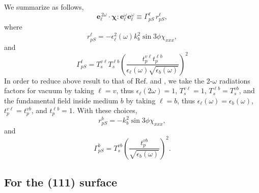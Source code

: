 We summarize as follows,
\begin{equation*}
\mathbf{e}^{\,2\omega}_{\ell}\cdot
\boldsymbol{\chi}:\mathbf{e}^\omega_{\ell}\mathbf{e}^\omega_{\ell}
\equiv\Gamma^{\ell}_{pS}\, r^{\ell}_{pS},
\end{equation*}
where
\begin{equation*}
r^{\ell}_{pS}
= -\epsilon^{2}_{\ell}(\omega)k^{2}_{b}\sin3\phi\chi_{xxx},
\end{equation*} 
and  
\begin{equation*}
\Gamma^{\ell}_{pS} =
T^{v\ell}_{s}T^{\ell b}_{s}\left(\frac{t^{v\ell}_{p}t^{\ell b}_{p}}
      {\epsilon_{\ell}(\omega)\sqrt{\epsilon_{b}(\omega)}}\right)^{2}
\end{equation*} 
In order to reduce above result to that of Ref. \cite{mizrahiJOSA88} and
\cite{sipePRB87},  we take the 2-$\omega$ radiations factors for vacuum by
taking $\ell=v$, thus $\epsilon_{\ell}(2\omega)=1$, $T^{v\ell}_{s}=1$,
$T^{\ell b}_{s}=T^{vb}_{s}$, and the fundamental field inside medium $b$ by
taking $\ell=b$, thus $\epsilon_{\ell}(\omega)=\epsilon_{b}(\omega)$,
$t^{v\ell}_{p}=t^{vb}_{p}$, and $t^{\ell b}_{p}=1$. With these choices,
\begin{equation*}
r^{b}_{pS} = -k^{2}_{b}\sin3\phi\chi_{xxx},
\end{equation*} 
and 
\begin{equation*}
\Gamma^{b}_{pS} =
T^{vb}_{s}
\left(
\frac{t^{vb}_{p}}{\sqrt{\epsilon_{b}(\omega)}}
\right)^{2}.  
\end{equation*} 


\subsection{For the (111) surface}

